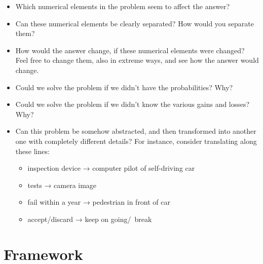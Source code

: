 \documentclass[
  a4paper,
  DIV=11,
  numbers=noendperiod,
  oneside]{scrreprt}
\providecommand{\tightlist}{%
  \setlength{\itemsep}{0pt}\setlength{\parskip}{0pt}}\usepackage{longtable,booktabs,array}
\begin{document}
\begin{itemize}
\item
  Which numerical elements in the problem seem to affect the answer?
\item
  Can these numerical elements be clearly separated? How would you
  separate them?
\item
  How would the answer change, if these numerical elements were changed?
  Feel free to change them, also in extreme ways, and see how the answer
  would change.
\item
  Could we solve the problem if we didn't have the probabilities? Why?
\item
  Could we solve the problem if we didn't know the various gains and
  losses? Why?
\item
  Can this problem be somehow abstracted, and then transformed into
  another one with completely different details? For instance, consider
  translating along these lines:

  \begin{itemize}
  \tightlist
  \item
    inspection device → computer pilot of self-driving car
  \item
    tests → camera image
  \item
    fail within a year → pedestrian in front of car
  \item
    accept/discard → keep on going/~break
  \end{itemize}
\end{itemize}


\hypertarget{framework}{%
\chapter{Framework}\label{framework}}

\providecommand{\ul}{\uline}
\renewcommand*{\|}[1][]{\nonscript\:#1\vert\nonscript\:\mathopen{}}
\providecommand*{\pr}[1]{\textsf{\small`#1'}}
\renewcommand*{\pr}[1]{\textsf{\small`#1'}}
\providecommand*{\prq}[1]{\textsf{\small #1}}
\renewcommand*{\prq}[1]{\textsf{\small #1}}
\providecommand{\se}[1]{\mathsfit{#1}}
\renewcommand{\se}[1]{\mathsfit{#1}}
\providecommand{\p}{\mathrm{p}}
\renewcommand{\p}{\mathrm{p}}
\renewcommand{\P}{\mathrm{P}}
\end{document}

